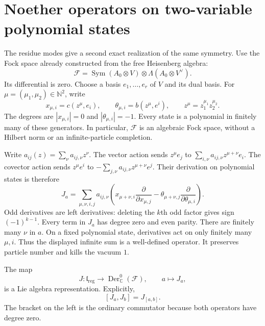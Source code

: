 \section{Noether operators on two-variable polynomial states}
\label{sec:clo-fock-action}

The residue modes give a second exact realization of the same symmetry.
Use the Fock space already constructed from the free Heisenberg algebra:
\[
 \mathcal F=\operatorname{Sym}(A_0\otimes V)
          \otimes\Lambda(A_0\otimes V^\vee).
\]
Its differential is zero.
Choose a basis $e_1,\ldots,e_r$ of $V$ and its dual basis.
For $\mu=(\mu_1,\mu_2)\in\mathbb N^2$, write
\[
 x_{\mu,i}=c(z^\mu,e_i),\qquad
 \theta_{\mu,i}=b(z^\mu,e^i),\qquad z^\mu=z_1^{\mu_1}z_2^{\mu_2}.
\]
The degrees are $|x_{\mu,i}|=0$ and $|\theta_{\mu,i}|=-1$.
Every state is a polynomial in finitely many of these generators.
In particular, $\mathcal F$ is an algebraic Fock space, without a
Hilbert norm or an infinite-particle completion.

Write $a_{ij}(z)=\sum_\nu a_{ij,\nu}z^\nu$.
The vector action sends $z^\mu e_j$ to
$\sum_{i,\nu}a_{ij,\nu}z^{\mu+\nu}e_i$.
The covector action sends $z^\mu e^i$ to
$-\sum_{j,\nu}a_{ij,\nu}z^{\mu+\nu}e^j$.
Their derivation on polynomial states is therefore
\begin{equation}\label{eq:clo-noether-operator}
 J_a=\sum_{\mu,\nu,i,j}a_{ij,\nu}
 \left(
 x_{\mu+\nu,i}\frac{\partial}{\partial x_{\mu,j}}
 -\theta_{\mu+\nu,j}\frac{\partial}{\partial\theta_{\mu,i}}
 \right).
\end{equation}
Odd derivatives are left derivatives: deleting the $k$th odd factor
gives sign $(-1)^{k-1}$.
Every term in $J_a$ has degree zero and even parity.
There are finitely many $\nu$ in $a$.
On a fixed polynomial state, derivatives act on only finitely many
$\mu,i$. Thus the displayed infinite sum is a well-defined operator.
It preserves particle number and kills the vacuum $1$.

\begin{theorem}\label{thm:clo-noether-lie}
The map
\[
 J:\mathfrak l_{\mathrm{reg}}\longrightarrow
          \operatorname{Der}^0_{\mathbb C}(\mathcal F),\qquad a\mapsto J_a,
\]
is a Lie algebra representation. Explicitly,
\begin{equation}\label{eq:clo-noether-bracket}
 [J_a,J_b]=J_{[a,b]}.
\end{equation}
The bracket on the left is the ordinary commutator because both
operators have degree zero.
\end{theorem}

